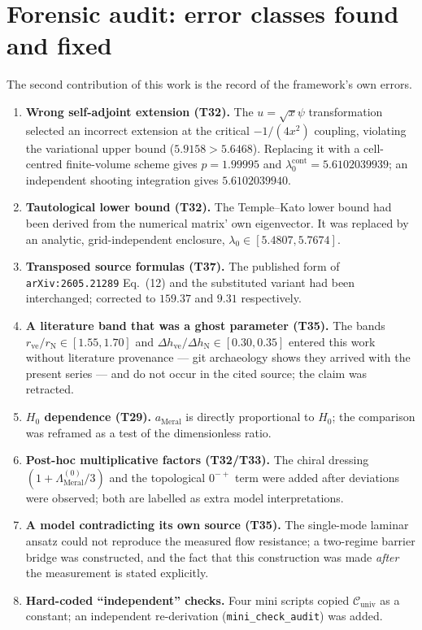 \documentclass[12pt,a4paper]{article}
\begin{document}
\section{Forensic audit: error classes found and fixed}
The second contribution of this work is the record of the framework's own
errors.
\begin{enumerate}
    \item \textbf{Wrong self-adjoint extension (T32).} The
    $u=\sqrt{x}\psi$ transformation selected an incorrect extension at the
    critical $-1/(4x^2)$ coupling, violating the variational upper bound
    ($5.9158 > 5.6468$). Replacing it with a cell-centred finite-volume
    scheme gives $p = 1.99995$ and
    $\lambda_0^{\mathrm{cont}} = 5.6102039939$; an independent shooting
    integration gives $5.6102039940$.
    \item \textbf{Tautological lower bound (T32).} The Temple--Kato lower
    bound had been derived from the numerical matrix' own eigenvector. It
    was replaced by an analytic, grid-independent enclosure,
    $\lambda_0 \in [5.4807, 5.7674]$.
    \item \textbf{Transposed source formulas (T37).} The published form of
    \texttt{arXiv:2605.21289} Eq.~(12) and the substituted variant had
    been interchanged; corrected to $159.37$ and $9.31$ respectively.
    \item \textbf{A literature band that was a ghost parameter (T35).}
    The bands $r_{\mathrm{ve}}/r_{\mathrm{N}} \in [1.55,1.70]$ and
    $\Delta h_{\mathrm{ve}}/\Delta h_{\mathrm{N}} \in [0.30,0.35]$ entered
    this work without literature provenance --- git archaeology shows they
    arrived with the present series --- and do not occur in the cited
    source; the claim was retracted.
    \item \textbf{$H_0$ dependence (T29).} $a_{\mathrm{Meral}}$ is directly
    proportional to $H_0$; the comparison was reframed as a test of the
    dimensionless ratio.
    \item \textbf{Post-hoc multiplicative factors (T32/T33).} The chiral
    dressing $(1+\Lambda_{\mathrm{Meral}}^{(0)}/3)$ and the topological
    $0^{-+}$ term were added after deviations were observed; both are
    labelled as extra model interpretations.
    \item \textbf{A model contradicting its own source (T35).} The
    single-mode laminar ansatz could not reproduce the measured flow
    resistance; a two-regime barrier bridge was constructed, and the fact
    that this construction was made \emph{after} the measurement is stated
    explicitly.
    \item \textbf{Hard-coded ``independent'' checks.} Four mini scripts
    copied $\mathcal{C}_{\mathrm{univ}}$ as a constant; an independent
    re-derivation (\texttt{mini\_check\_audit}) was added.
\end{enumerate}
\end{document}
